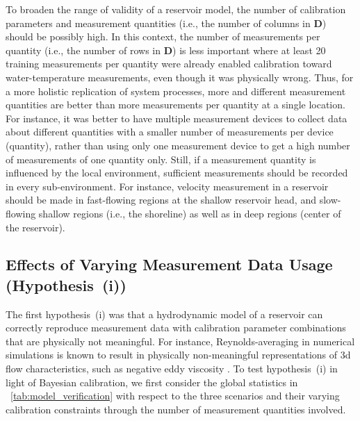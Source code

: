 \documentclass[draft,linenumbers,onecolumn]{agujournal2019} %
\begin{document}
To broaden the range of validity of a reservoir model, the number of calibration parameters and measurement quantities (i.e., the number of columns in $\mathbf{D}$) should be possibly high. In this context, the number of measurements per quantity (i.e., the number of rows in $\mathbf{D}$) is less important where at least 20 training measurements per quantity were already enabled calibration toward water-temperature measurements, even though it was physically wrong. Thus, for a more holistic replication of system processes, more and different measurement quantities are better than more measurements per quantity at a single location. For instance, it was better to have multiple measurement devices to collect data about different quantities with a smaller number of measurements per device (quantity), rather than using only one measurement device to get a high number of measurements of one quantity only. Still, if a measurement quantity is influenced by the local environment, sufficient measurements should be recorded in every sub-environment. For instance, velocity measurement in a reservoir should be made in fast-flowing regions at the shallow reservoir head, and slow-flowing shallow regions (i.e., the shoreline) as well as in deep regions (center of the reservoir).

\subsection{Effects of Varying Measurement Data Usage (Hypothesis~(i))}

The first hypothesis~(i) was that a hydrodynamic model of a reservoir can correctly reproduce measurement data with calibration parameter combinations that are physically not meaningful. For instance, Reynolds-averaging in numerical simulations is known to result in physically non-meaningful representations of 3d flow characteristics, such as negative eddy viscosity \cite{booij_measurements_2003}. To test hypothesis~(i) in light of Bayesian calibration, we first consider the global statistics in \tablename{~\ref{tab:model_verification}} with respect to the three scenarios and their varying calibration constraints through the number of measurement quantities involved.
\end{document}
